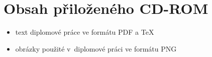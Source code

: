 
\chapter{Obsah přiloženého CD-ROM} \label{kap:Obsah_CD}
\begin{itemize}
\item text diplomové práce ve formátu PDF a \TeX{}
\item obrázky použité v~diplomové práci ve formátu PNG
\end{itemize}